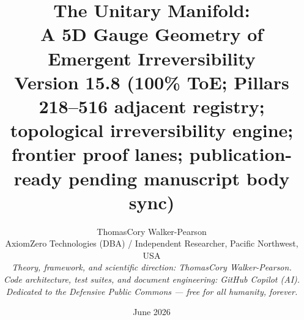 \documentclass[12pt,a4paper]{article}
\begin{document}
\title{\textbf{The Unitary Manifold:}\\
A 5D Gauge Geometry of Emergent Irreversibility\\[4pt]
{\large Version 15.8 (100\% ToE; Pillars 218--516 adjacent registry; topological irreversibility engine; frontier proof lanes; publication-ready pending manuscript body sync)}}

\author{ThomasCory Walker-Pearson\\[4pt]
\small AxiomZero Technologies (DBA) / Independent Researcher, Pacific Northwest, USA\\[2pt]
\small \textit{Theory, framework, and scientific direction: ThomasCory Walker-Pearson.}\\
\small \textit{Code architecture, test suites, and document engineering: GitHub Copilot (AI).}\\[2pt]
\small \textit{Dedicated to the Defensive Public Commons — free for all humanity, forever.}}

\date{June 2026}
\maketitle
\end{document}
